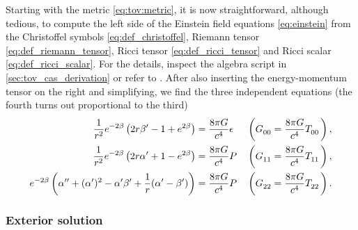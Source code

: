 Starting with the metric \eqref{eq:tov:metric}, it is now straightforward, although tedious, to compute the left side of the Einstein field equations \eqref{eq:einstein} from the Christoffel symbols \eqref{eq:def_christoffel}, Riemann tensor \eqref{eq:def_riemann_tensor}, Ricci tensor \eqref{eq:def_ricci_tensor} and Ricci scalar \eqref{eq:def_ricci_scalar}.
For the details, inspect the algebra script in \cref{sec:tov_cas_derivation} or refer to \cite[equation 5.11-5.15]{ref:carroll}.
After also inserting the energy-momentum tensor on the right and simplifying, we find the three independent equations
(the fourth turns out proportional to the third)
\begin{subequations}
\begin{align}
	\frac{1}{r^2} e^{-2 \beta} \left( 2 r \beta' - 1 + e^{2 \beta} \right)                               &= \frac{8 \pi G}{c^4} \epsilon
	&& \left( G\indices{_0_0} = \frac{8 \pi G}{c^4} T\indices{_0_0} \right) , \label{eq:einstein_to_tov:tt} \\
	\frac{1}{r^2} e^{-2 \beta} \left( 2 r \alpha' + 1 - e^{2 \beta} \right)                              &= \frac{8 \pi G}{c^4} P
	&& \left( G\indices{_1_1} = \frac{8 \pi G}{c^4} T\indices{_1_1} \right) , \label{eq:einstein_to_tov:rr} \\
	e^{-2 \beta} \left( \alpha'' + (\alpha')^2 - \alpha' \beta' + \frac{1}{r} (\alpha' - \beta') \right) &= \frac{8 \pi G}{c^4} P
	&& \left( G\indices{_2_2} = \frac{8 \pi G}{c^4} T\indices{_2_2} \right) . \label{eq:einstein_to_tov:thetatheta}
\end{align}
\label{eq:einstein_to_tov:einstein_equation_in_star}
\end{subequations}

\subsubsection{Exterior solution}

